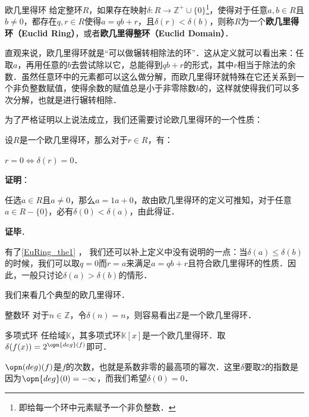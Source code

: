 

\begin{definition}{欧几里得环}
给定整环$R$，如果存在映射$\delta:R\to\mathbb{Z}^+\cup\{0\}$\footnote{即给每一个环中元素赋予一个非负整数．}，使得对于任意$a, b\in R$且$b\not=0$，都存在$q, r\in R$使得$a=qb+r$，且$\delta(r)<\delta(b)$，则称$R$为一个\textbf{欧几里得环（Euclid Ring）}，或者\textbf{欧几里得整环（Euclid Domain）}．
\end{definition}



直观来说，欧几里得环就是“可以做辗转相除法的环”．这从定义就可以看出来：任取$a$，再用任意的$b$去尝试除以它，总能得到$qb+r$的形式，其中$r$相当于除法的余数．虽然任意环中的元素都可以这么做分解，而欧几里得环就特殊在它还关系到一个非负整数赋值，使得余数的赋值总是小于非零除数$b$的，这样就使得我们可以多次分解，也就是进行辗转相除．

为了严格证明以上说法成立，我们还需要讨论欧几里得环的一个性质：

\begin{theorem}{}\label{EuRing_the1}
设$R$是一个欧几里得环，那么对于$r\in R$，有：

$r=0\iff \delta(r)=0$．
\end{theorem}

\textbf{证明}：

任选$a\in R$且$a\not=0$，那么$a=1a+0$，故由欧几里得环的定义可推知，对于任意$a\in R-\{0\}$，必有$\delta(0)<\delta(a)$，由此得证．

\textbf{证毕}．

有了\autoref{EuRing_the1} ， 我们还可以补上定义中没有说明的一点：当$\delta(a)\leq\delta(b)$的时候，我们可以取$q=0$而$r=a$来满足$a=qb+r$且符合欧几里得环的性质．因此，一般只讨论$\delta(a)>\delta(b)$的情形．

我们来看几个典型的欧几里得环．

\begin{example}{整数环}
对于$n\in\mathbb{Z}$，令$\delta(n)=n$，则容易看出$\mathbb{Z}$是一个欧几里得环．
\end{example}

\begin{example}{多项式环}
任给域$\mathbb{K}$，其多项式环$\mathbb{K}[x]$是一个欧几里得环．取$\delta(f(x))=2^{\opn{deg}(f)}$即可．
\end{example}

$\opn(deg)(f)$是$f$的次数，也就是系数非零的最高项的幂次．这里$\delta$要取$2$的指数是因为$\opn{deg}(0)=-\infty$，而我们希望$\delta(0)=0$．

